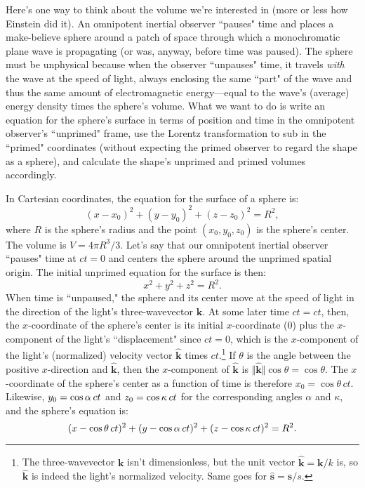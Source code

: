 \documentclass[12pt]{article}
\renewcommand{\vv}[1]{\mathbf{#1}}
\begin{document}
Here's one way to think about the volume we're interested in (more or less how Einstein did it). An omnipotent inertial observer ``pauses" time and places a make-believe sphere around a patch of space through which a monochromatic plane wave is propagating (or was, anyway, before time was paused). The sphere must be unphysical because when the observer ``unpauses" time, it travels \emph{with} the wave at the speed of light, always enclosing the same ``part" of the wave and thus the same amount of electromagnetic energy---equal to the wave's (average) energy density times the sphere's volume. What we want to do is write an equation for the sphere's surface in terms of position and time in the omnipotent observer's ``unprimed" frame, use the Lorentz transformation to sub in the ``primed" coordinates (without expecting the primed observer to regard the shape as a sphere), and calculate the shape's unprimed and primed volumes accordingly.

In Cartesian coordinates, the equation for the surface of a sphere is:
\begin{equation*}
(x - x_0)^2 + (y - y_0)^2 + (z - z_0)^2 = R^2,
\end{equation*}
where $R$ is the sphere's radius and the point $(x_0, y_0, z_0)$ is the sphere's center. The volume is $V = 4 \pi R^3 / 3$. Let's say that our omnipotent inertial observer ``pauses" time at ${ct = 0}$ and centers the sphere around the unprimed spatial origin. The initial unprimed equation for the surface is then:
\begin{equation*}
x^2 + y^2 + z^2 = R^2.
\end{equation*}
When time is ``unpaused," the sphere and its center move at the speed of light in the direction of the light's three-wavevector $\vv k$. At some later time $ct = ct$, then, the $x$-coordinate of the sphere's center is its initial $x$-coordinate ($0$) plus the $x$-component of the light's ``displacement" since $ct = 0$, which is the $x$-component of the light's (normalized) velocity vector $\vv{\hat{k}}$ times $ct$.\footnote{The three-wavevector $\vv k$ isn't dimensionless, but the unit vector $\vv{\hat{k}} = \vv k / k$ is, so $\vv{\hat{k}}$ is indeed the light's normalized velocity. Same goes for $\vv{\hat s} = \vv s / s$.} If $\theta$ is the angle between the positive $x$-direction and $\vv{\hat{k}}$, then the $x$-component of $\vv{\hat{k}}$ is $\Vert \vv{\hat{k}} \Vert \cos{\theta} = \cos{\theta}$. The $x$-coordinate of the sphere's center as a function of time is therefore $x_0 = \cos{\theta} \, ct$. Likewise, $y_0 = \cos{\alpha} \, \mkern.5mu ct$ and $z_0 = \cos{\kappa} \, \mkern.5mu ct$ for the corresponding angles $\alpha$ and $\kappa$, and the sphere's equation is:
\begin{equation*}
(x - \cos{\theta} \, ct)^2 + (y - \cos{\alpha} \, \mkern.5mu ct)^2 + (z - \cos{\kappa} \, \mkern.5mu ct)^2 = R^2 .
\end{equation*}
\end{document}
